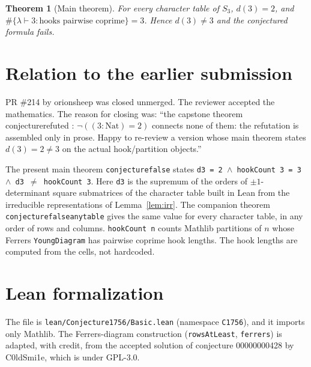 \documentclass[11pt]{article}
\renewcommand{\_}{\oldus\allowbreak}
\newtheorem{theorem}{Theorem}
\theoremstyle{definition}
\theoremstyle{remark}
\begin{document}
\begin{theorem}[Main theorem]
For every character table of $S_3$, $d(3)=2$, and $\#\{\lambda\vdash3:\text{hooks pairwise coprime}\}=3$. Hence $d(3)\ne3$ and the conjectured
formula fails.
\end{theorem}

\section{Relation to the earlier submission}
PR \#214 by orionsheep was closed unmerged. The reviewer accepted the mathematics. The reason for closing
was: ``the capstone theorem conjecture\_refuted : $\neg((3:\mathrm{Nat}) = 2)$ connects none of them: the
refutation is assembled only in prose. Happy to re-review a version whose main theorem states
$d(3) = 2 \ne 3$ on the actual hook/partition objects.''

The present main theorem \texttt{conjecture\_1756\_false} states \texttt{d3 = 2 $\wedge$ hookCount 3 = 3
$\wedge$ d3 $\ne$ hookCount 3}. Here \texttt{d3} is the supremum of the orders of $\pm1$-determinant
square submatrices of the character table built in Lean from the irreducible representations of
Lemma~\ref{lem:irr}. The companion theorem \texttt{conjecture\_1756\_false\_any\_table} gives the
same value for every character table, in any order of rows and columns. \texttt{hookCount n} counts Mathlib partitions of $n$ whose
Ferrers \texttt{YoungDiagram} has pairwise coprime hook lengths. The hook lengths are computed from the
cells, not hardcoded.

\section{Lean formalization}
The file is \texttt{lean/Conjecture1756/Basic.lean} (namespace \texttt{C1756}), and it imports only
Mathlib. The Ferrers-diagram construction (\texttt{rowsAtLeast}, \texttt{ferrers}) is adapted, with
credit, from the accepted solution of conjecture 00000000428 by C0ldSmi1e, which is under GPL-3.0.
\end{document}
